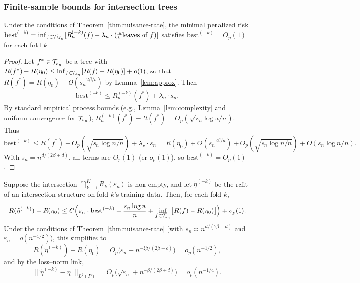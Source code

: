 \documentclass[12pt]{article}
\begin{document}
\subsubsection{Finite-sample bounds for intersection trees}

\begin{lemma}
\label{lem:best-bounded}
Under the conditions of Theorem~\ref{thm:nuisance-rate}, the minimal penalized risk $\text{best}^{(-k)} = \inf_{f \in \mathcal{T}_{M_n}} [ R_n^{(-k)}(f) + \lambda_n \cdot (\#\text{leaves of } f) ]$ satisfies $\text{best}^{(-k)} = O_p(1)$ for each fold $k$.
\end{lemma}

\begin{proof}
Let $f^* \in \mathcal{T}_{s_n}$ be a tree with $R(f^*) - R(\eta_0) \le \inf_{f \in \mathcal{T}_{s_n}}[R(f) - R(\eta_0)] + o(1)$, so that $R(f^*) = R(\eta_0) + O(s_n^{-2\beta/d})$ by Lemma~\ref{lem:approx}. Then
\[
\text{best}^{(-k)} \le R_n^{(-k)}(f^*) + \lambda_n \cdot s_n.
\]
By standard empirical process bounds (e.g., Lemma~\ref{lem:complexity} and uniform convergence for $\mathcal{T}_{s_n}$), $R_n^{(-k)}(f^*) - R(f^*) = O_p(\sqrt{s_n \log n / n})$. Thus
\[
\text{best}^{(-k)} \le R(f^*) + O_p(\sqrt{s_n \log n / n}) + \lambda_n \cdot s_n = R(\eta_0) + O(s_n^{-2\beta/d}) + O_p(\sqrt{s_n \log n / n}) + O(s_n \log n / n).
\]
With $s_n = n^{d/(2\beta+d)}$, all terms are $O_p(1)$ (or $o_p(1)$), so $\text{best}^{(-k)} = O_p(1)$.
\end{proof}

\begin{lemma}
\label{lem:intersection-bias}
Suppose the intersection $\bigcap_{k=1}^K R_k(\varepsilon_n)$ is non-empty, and let $\tilde{\eta}^{(-k)}$ be the refit of an intersection structure on fold $k$'s training data. Then, for each fold $k$,
\[
R(\tilde{\eta}^{(-k)}) - R(\eta_0) \le C \Bigl( \varepsilon_n \cdot \text{best}^{(-k)} + \frac{s_n \log n}{n} + \inf_{f \in \mathcal{T}_{s_n}} \bigl[ R(f) - R(\eta_0) \bigr] \Bigr) + o_p(1).
\]
Under the conditions of Theorem~\ref{thm:nuisance-rate} (with $s_n \asymp n^{d/(2\beta+d)}$ and $\varepsilon_n = o(n^{-1/2})$), this simplifies to
\[
R(\tilde{\eta}^{(-k)}) - R(\eta_0) = O_p\bigl( \varepsilon_n + n^{-2\beta/(2\beta+d)} \bigr) = o_p(n^{-1/2}),
\]
and by the loss--norm link,
\[
\|\tilde{\eta}^{(-k)} - \eta_0\|_{L^2(P)} = O_p\bigl( \sqrt{\varepsilon_n} + n^{-\beta/(2\beta+d)} \bigr) = o_p(n^{-1/4}).
\]
\end{lemma}
\end{document}
